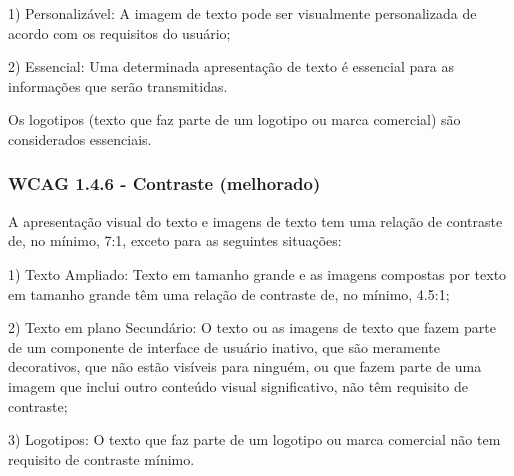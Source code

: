 \documentclass[a4paper]{article}
\begin{document}
\begin{titlepage}
\hspace{.1\textwidth} %
\begin{minipage}{.85\textwidth}
	1) Personalizável: A imagem de texto pode ser visualmente personalizada de acordo com os requisitos do usuário;\\
\end{minipage}

\hspace{.1\textwidth} %
\begin{minipage}{.85\textwidth}
	2) Essencial: Uma determinada apresentação de texto é essencial para as informações que serão transmitidas.\\
\end{minipage}

Os logotipos (texto que faz parte de um logotipo ou marca comercial) são considerados essenciais.

\subsubsection{WCAG 1.4.6 - Contraste (melhorado)}

A apresentação visual do texto e imagens de texto tem uma relação de contraste de, no mínimo, 7:1, exceto para as seguintes situações:\\

\hspace{.1\textwidth} %
\begin{minipage}{.85\textwidth}
	1) Texto Ampliado: Texto em tamanho grande e as imagens compostas por texto em tamanho grande têm uma relação de contraste de, no mínimo, 4.5:1;\\
\end{minipage}

\hspace{.1\textwidth} %
\begin{minipage}{.85\textwidth}
	2) Texto em plano Secundário: O texto ou as imagens de texto que fazem parte de um componente de interface de usuário inativo, que são meramente decorativos, que não estão visíveis para ninguém, ou que fazem parte de uma imagem que inclui outro conteúdo visual significativo, não têm requisito de contraste;\\
\end{minipage}

\hspace{.1\textwidth} %
\begin{minipage}{.85\textwidth}
	3) Logotipos: O texto que faz parte de um logotipo ou marca comercial não tem requisito de contraste mínimo.\\
\end{minipage}


\end{titlepage}
\end{document}
